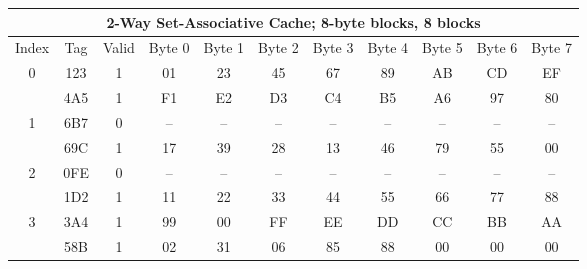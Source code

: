 \documentclass{article}
\begin{document}
\begin{tabular}{||c|c|c||c|c|c|c|c|c|c|c||} \hline\hline
\multicolumn{11}{||c||}{2-Way Set-Associative Cache; 8-byte blocks, 8 blocks} \\ \hline
Index & Tag & Valid & Byte 0 & Byte 1 & Byte 2 & Byte 3 & Byte 4 & Byte 5 & Byte 6 & Byte 7 \\ \hline\hline
\multirow{2}{*}{0} & 123 & 1 & 01 & 23 & 45 & 67 & 89 & AB & CD & EF \\ \cline{2-11}
                   & 4A5 & 1 & F1 & E2 & D3 & C4 & B5 & A6 & 97 & 80 \\ \hline
\multirow{2}{*}{1} & 6B7 & 0 & -- & -- & -- & -- & -- & -- & -- & -- \\ \cline{2-11}
                   & 69C & 1 & 17 & 39 & 28 & 13 & 46 & 79 & 55 & 00 \\ \hline
\multirow{2}{*}{2} & 0FE & 0 & -- & -- & -- & -- & -- & -- & -- & -- \\ \cline{2-11}
                   & 1D2 & 1 & 11 & 22 & 33 & 44 & 55 & 66 & 77 & 88 \\ \hline
\multirow{2}{*}{3} & 3A4 & 1 & 99 & 00 & FF & EE & DD & CC & BB & AA \\ \cline{2-11}
                   & 58B & 1 & 02 & 31 & 06 & 85 & 88 & 00 & 00 & 00 \\ \hline\hline
\end{tabular}
\end{document}
